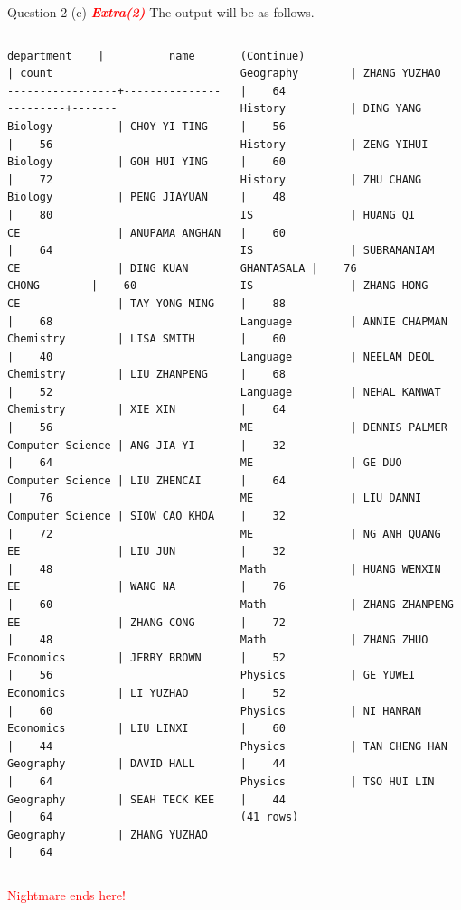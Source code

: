 \begin{frame}[fragile]{Question 2 (c) \textcolor{red}{\textit{\textbf{Extra(2)}}}}
The output will be as follows.

\begin{columns}[t]
	
\begin{lstlisting}[style=terminal-tiny]
   department    |          name          | count 
-----------------+------------------------+-------
Biology          | CHOY YI TING           |    56
Biology          | GOH HUI YING           |    72
Biology          | PENG JIAYUAN           |    80
CE               | ANUPAMA ANGHAN         |    64
CE               | DING KUAN CHONG        |    60
CE               | TAY YONG MING          |    68
Chemistry        | LISA SMITH             |    40
Chemistry        | LIU ZHANPENG           |    52
Chemistry        | XIE XIN                |    56
Computer Science | ANG JIA YI             |    64
Computer Science | LIU ZHENCAI            |    76
Computer Science | SIOW CAO KHOA          |    72
EE               | LIU JUN                |    48
EE               | WANG NA                |    60
EE               | ZHANG CONG             |    48
Economics        | JERRY BROWN            |    56
Economics        | LI YUZHAO              |    60
Economics        | LIU LINXI              |    44
Geography        | DAVID HALL             |    64
Geography        | SEAH TECK KEE          |    64
Geography        | ZHANG YUZHAO           |    64
\end{lstlisting}

\begin{lstlisting}[style=terminal-tiny]
(Continue)
Geography        | ZHANG YUZHAO           |    64
History          | DING YANG              |    56
History          | ZENG YIHUI             |    60
History          | ZHU CHANG              |    48
IS               | HUANG QI               |    60
IS               | SUBRAMANIAM GHANTASALA |    76
IS               | ZHANG HONG             |    88	
Language         | ANNIE CHAPMAN          |    60
Language         | NEELAM DEOL            |    68
Language         | NEHAL KANWAT           |    64
ME               | DENNIS PALMER          |    32
ME               | GE DUO                 |    64
ME               | LIU DANNI              |    32
ME               | NG ANH QUANG           |    32
Math             | HUANG WENXIN           |    76
Math             | ZHANG ZHANPENG         |    72
Math             | ZHANG ZHUO             |    52
Physics          | GE YUWEI               |    52
Physics          | NI HANRAN              |    60
Physics          | TAN CHENG HAN          |    44
Physics          | TSO HUI LIN            |    44
(41 rows)
\end{lstlisting}
\end{columns}
\begin{center}	
\textcolor{red}{Nightmare ends here!}
\end{center}

\end{frame}

